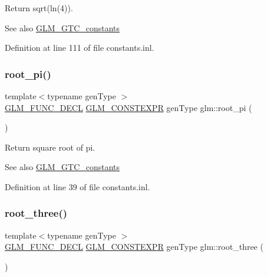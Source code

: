 Return sqrt(ln(4)). \begin{DoxySeeAlso}{See also}
\mbox{\hyperlink{group__gtc__constants}{G\+L\+M\+\_\+\+G\+T\+C\+\_\+constants}} 
\end{DoxySeeAlso}


Definition at line 111 of file constants.\+inl.

\mbox{\label{group__gtc__constants_ga261380796b2cd496f68d2cf1d08b8eb9}} 
\subsubsection{\texorpdfstring{root\_pi()}{root\_pi()}}
{\footnotesize\ttfamily template$<$typename gen\+Type $>$ \\
\mbox{\hyperlink{setup_8hpp_ab2d052de21a70539923e9bcbf6e83a51}{G\+L\+M\+\_\+\+F\+U\+N\+C\+\_\+\+D\+E\+CL}} \mbox{\hyperlink{setup_8hpp_a08b807947b47031d3a511f03f89645ad}{G\+L\+M\+\_\+\+C\+O\+N\+S\+T\+E\+X\+PR}} gen\+Type glm\+::root\+\_\+pi (\begin{DoxyParamCaption}{ }\end{DoxyParamCaption})}

Return square root of pi. \begin{DoxySeeAlso}{See also}
\mbox{\hyperlink{group__gtc__constants}{G\+L\+M\+\_\+\+G\+T\+C\+\_\+constants}} 
\end{DoxySeeAlso}


Definition at line 39 of file constants.\+inl.

\mbox{\label{group__gtc__constants_ga4f286be4abe88be1eed7d2a9f6cb193e}} 
\subsubsection{\texorpdfstring{root\_three()}{root\_three()}}
{\footnotesize\ttfamily template$<$typename gen\+Type $>$ \\
\mbox{\hyperlink{setup_8hpp_ab2d052de21a70539923e9bcbf6e83a51}{G\+L\+M\+\_\+\+F\+U\+N\+C\+\_\+\+D\+E\+CL}} \mbox{\hyperlink{setup_8hpp_a08b807947b47031d3a511f03f89645ad}{G\+L\+M\+\_\+\+C\+O\+N\+S\+T\+E\+X\+PR}} gen\+Type glm\+::root\+\_\+three (\begin{DoxyParamCaption}{ }\end{DoxyParamCaption})}

